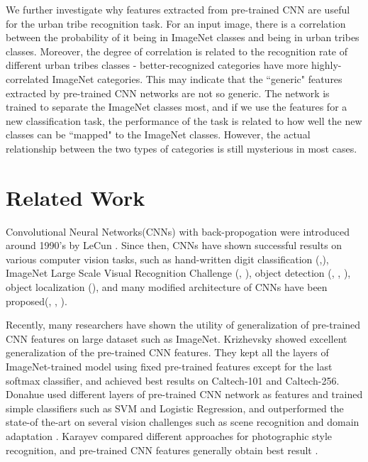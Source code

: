 \documentclass[10pt,twocolumn,letterpaper]{article}
\begin{document}
We further investigate why features extracted from pre-trained CNN are useful for the urban tribe recognition task. For an input image, there is a correlation between the probability of it being in ImageNet classes and being in urban tribes classes. Moreover, the degree of correlation is related to the recognition rate of different urban tribes classes - better-recognized categories have more highly-correlated ImageNet categories. This may indicate that the ``generic" features extracted by pre-trained CNN networks are not so generic. The network is trained to separate the ImageNet classes most, and if we use the features for a new classification task, the performance of the task is related to how well the new classes can be ``mapped" to the ImageNet classes. However, the actual relationship between the two types of categories is still mysterious in most cases.


\section{Related Work}

Convolutional Neural Networks(CNNs) with back-propogation were introduced around 1990's by LeCun \etal\cite{lecun89}.  Since then, CNNs have shown successful results on various computer vision tasks, such as hand-written digit classification (\cite{lecun98},\cite{maxout}), ImageNet Large Scale Visual Recognition Challenge (\cite{ImageNet}, \cite{googlenet}), object detection (\cite{googlenet}, \cite{overfeat}, \cite{rnn}), object localization (\cite{overfeat}), and many modified architecture of CNNs have been proposed(\cite{maxout}, \cite{dropout}, \cite{nin}).

Recently, many researchers have shown the utility of generalization of pre-trained CNN features on large dataset such as ImageNet. Krizhevsky \etal showed excellent generalization of the pre-trained CNN features\cite{ImageNet13}. They kept all the layers of ImageNet-trained model using fixed pre-trained features except for the last softmax classifier, and achieved best results on Caltech-101 and Caltech-256. Donahue \etal used different layers of pre-trained CNN network as features and trained simple classifiers such as SVM and Logistic Regression, and outperformed the state-of the-art on several vision challenges such as scene recognition and domain adaptation\cite{decaf} . Karayev \etal compared different approaches for photographic style recognition, and pre-trained CNN features generally obtain best result \cite{style}. 
\end{document}
